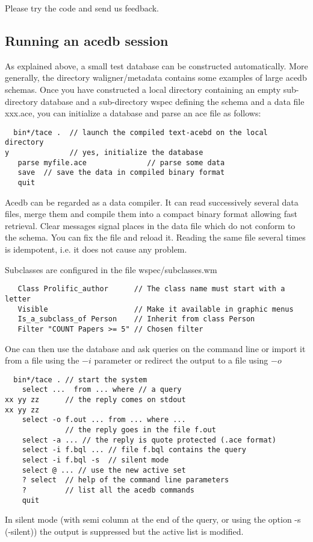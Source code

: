 \documentclass[11pt]{article}
\newcommand{\BL}{\begin{lstlisting}}
\begin{document}
Please try the code and send us feedback. 



\subsection {Running an acedb session}

As explained above, a small test database can be constructed
automatically.
More generally, the directory waligner/metadata contains 
some examples of large acedb schemas.
Once you have constructed a local directory
containing an empty sub-directory database and a sub-directory wspec
defining the schema and a data file xxx.ace, you can
initialize a database and parse an ace file as follows:
\BL
  bin*/tace .  // launch the compiled text-acebd on the local directory
y              // yes, initialize the database
   parse myfile.ace              // parse some data
   save  // save the data in compiled binary format 
   quit
\end{lstlisting}
 Acedb can be regarded as a data compiler. It can read successively several
data files, merge them and compile them into a compact binary format allowing
fast retrieval. Clear messages signal places in the data file which do not conform
to the schema. You can fix the file and reload it. Reading the same file several
times is idempotent, i.e. it does not cause any problem.

Subclasses are configured in the file wspec/subclasses.wm

\BL
   Class Prolific_author      // The class name must start with a letter
   Visible                    // Make it available in graphic menus
   Is_a_subclass_of Person    // Inherit from class Person
   Filter "COUNT Papers >= 5" // Chosen filter
\end{lstlisting}

One can then use the database and ask queries on the command
line or import it from a file using the $-$$i$ parameter
or redirect the output to a file using $-$$o$
\BL
  bin*/tace . // start the system
    select ...  from ... where // a query
xx yy zz      // the reply comes on stdout
xx yy zz
    select -o f.out ... from ... where ...
              // the reply goes in the file f.out
    select -a ... // the reply is quote protected (.ace format)
    select -i f.bql ... // file f.bql contains the query
    select -i f.bql -s  // silent mode
    select @ ... // use the new active set 
    ? select  // help of the command line parameters
    ?         // list all the acedb commands
    quit
\end{lstlisting}
In silent mode (with semi column at the end of the query, or using
the option -s (-silent)) the output is suppressed but the
active list is modified.
\end{document}
